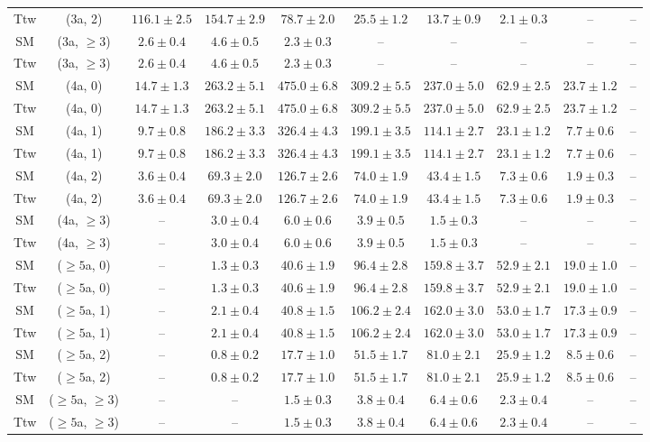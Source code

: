 \begin{table}[h!]
{\begin{tabular}{cccccccccc}
	Ttw & (3a, 2) & $116.1\pm 2.5$ & $154.7\pm 2.9$ & $78.7\pm 2.0$ & $25.5\pm 1.2$ & $13.7\pm 0.9$ & $2.1\pm 0.3$ & -- & -- \\[0.5ex] 
	SM & (3a, $\ge3$) & $2.6\pm 0.4$ & $4.6\pm 0.5$ & $2.3\pm 0.3$ & -- & -- & -- & -- & -- \\[0.5ex] 
	Ttw & (3a, $\ge3$) & $2.6\pm 0.4$ & $4.6\pm 0.5$ & $2.3\pm 0.3$ & -- & -- & -- & -- & -- \\[0.5ex] 
	SM & (4a, 0) & $14.7\pm 1.3$ & $263.2\pm 5.1$ & $475.0\pm 6.8$ & $309.2\pm 5.5$ & $237.0\pm 5.0$ & $62.9\pm 2.5$ & $23.7\pm 1.2$ & -- \\[0.5ex] 
	Ttw & (4a, 0) & $14.7\pm 1.3$ & $263.2\pm 5.1$ & $475.0\pm 6.8$ & $309.2\pm 5.5$ & $237.0\pm 5.0$ & $62.9\pm 2.5$ & $23.7\pm 1.2$ & -- \\[0.5ex] 
	SM & (4a, 1) & $9.7\pm 0.8$ & $186.2\pm 3.3$ & $326.4\pm 4.3$ & $199.1\pm 3.5$ & $114.1\pm 2.7$ & $23.1\pm 1.2$ & $7.7\pm 0.6$ & -- \\[0.5ex] 
	Ttw & (4a, 1) & $9.7\pm 0.8$ & $186.2\pm 3.3$ & $326.4\pm 4.3$ & $199.1\pm 3.5$ & $114.1\pm 2.7$ & $23.1\pm 1.2$ & $7.7\pm 0.6$ & -- \\[0.5ex] 
	SM & (4a, 2) & $3.6\pm 0.4$ & $69.3\pm 2.0$ & $126.7\pm 2.6$ & $74.0\pm 1.9$ & $43.4\pm 1.5$ & $7.3\pm 0.6$ & $1.9\pm 0.3$ & -- \\[0.5ex] 
	Ttw & (4a, 2) & $3.6\pm 0.4$ & $69.3\pm 2.0$ & $126.7\pm 2.6$ & $74.0\pm 1.9$ & $43.4\pm 1.5$ & $7.3\pm 0.6$ & $1.9\pm 0.3$ & -- \\[0.5ex] 
	SM & (4a, $\ge3$) & -- & $3.0\pm 0.4$ & $6.0\pm 0.6$ & $3.9\pm 0.5$ & $1.5\pm 0.3$ & -- & -- & -- \\[0.5ex] 
	Ttw & (4a, $\ge3$) & -- & $3.0\pm 0.4$ & $6.0\pm 0.6$ & $3.9\pm 0.5$ & $1.5\pm 0.3$ & -- & -- & -- \\[0.5ex] 
	SM & ($\ge5$a, 0) & -- & $1.3\pm 0.3$ & $40.6\pm 1.9$ & $96.4\pm 2.8$ & $159.8\pm 3.7$ & $52.9\pm 2.1$ & $19.0\pm 1.0$ & -- \\[0.5ex] 
	Ttw & ($\ge5$a, 0) & -- & $1.3\pm 0.3$ & $40.6\pm 1.9$ & $96.4\pm 2.8$ & $159.8\pm 3.7$ & $52.9\pm 2.1$ & $19.0\pm 1.0$ & -- \\[0.5ex] 
	SM & ($\ge5$a, 1) & -- & $2.1\pm 0.4$ & $40.8\pm 1.5$ & $106.2\pm 2.4$ & $162.0\pm 3.0$ & $53.0\pm 1.7$ & $17.3\pm 0.9$ & -- \\[0.5ex] 
	Ttw & ($\ge5$a, 1) & -- & $2.1\pm 0.4$ & $40.8\pm 1.5$ & $106.2\pm 2.4$ & $162.0\pm 3.0$ & $53.0\pm 1.7$ & $17.3\pm 0.9$ & -- \\[0.5ex] 
	SM & ($\ge5$a, 2) & -- & $0.8\pm 0.2$ & $17.7\pm 1.0$ & $51.5\pm 1.7$ & $81.0\pm 2.1$ & $25.9\pm 1.2$ & $8.5\pm 0.6$ & -- \\[0.5ex] 
	Ttw & ($\ge5$a, 2) & -- & $0.8\pm 0.2$ & $17.7\pm 1.0$ & $51.5\pm 1.7$ & $81.0\pm 2.1$ & $25.9\pm 1.2$ & $8.5\pm 0.6$ & -- \\[0.5ex] 
	SM & ($\ge5$a, $\ge3$) & -- & -- & $1.5\pm 0.3$ & $3.8\pm 0.4$ & $6.4\pm 0.6$ & $2.3\pm 0.4$ & -- & -- \\[0.5ex] 
	Ttw & ($\ge5$a, $\ge3$) & -- & -- & $1.5\pm 0.3$ & $3.8\pm 0.4$ & $6.4\pm 0.6$ & $2.3\pm 0.4$ & -- & -- \\[0.5ex] 
	\hline
	\hline
\end{tabular}}
\end{table}

